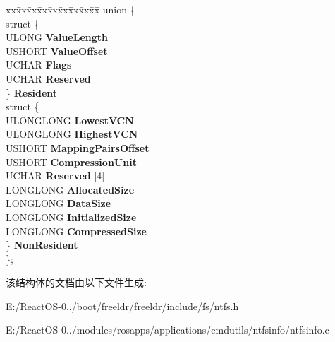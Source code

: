 \begin{DoxyCompactItemize}
\begin{tabbing}
\end{tabbing}\item 
\mbox{\label{struct_n_t_f_s___a_t_t_r___r_e_c_o_r_d_a6d98660a4798b88d6e20fe97bda75692}} 
\begin{tabbing}
xx\=xx\=xx\=xx\=xx\=xx\=xx\=xx\=xx\=\kill
union \{\\
\>struct \{\\
\>\>ULONG {\bfseries ValueLength}\\
\>\>USHORT {\bfseries ValueOffset}\\
\>\>UCHAR {\bfseries Flags}\\
\>\>UCHAR {\bfseries Reserved}\\
\>\} {\bfseries Resident}\\
\>struct \{\\
\>\>ULONGLONG {\bfseries LowestVCN}\\
\>\>ULONGLONG {\bfseries HighestVCN}\\
\>\>USHORT {\bfseries MappingPairsOffset}\\
\>\>USHORT {\bfseries CompressionUnit}\\
\>\>UCHAR {\bfseries Reserved} \mbox{[}4\mbox{]}\\
\>\>LONGLONG {\bfseries AllocatedSize}\\
\>\>LONGLONG {\bfseries DataSize}\\
\>\>LONGLONG {\bfseries InitializedSize}\\
\>\>LONGLONG {\bfseries CompressedSize}\\
\>\} {\bfseries NonResident}\\
\}; \\

\end{tabbing}\end{DoxyCompactItemize}


该结构体的文档由以下文件生成\+:\begin{DoxyCompactItemize}
\item 
E\+:/\+React\+O\+S-\/0../boot/freeldr/freeldr/include/fs/ntfs.\+h\item 
E\+:/\+React\+O\+S-\/0../modules/rosapps/applications/cmdutils/ntfsinfo/ntfsinfo.\+c\end{DoxyCompactItemize}

